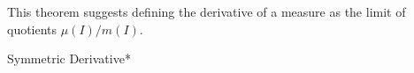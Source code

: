 This theorem suggests defining the derivative of a measure as the limit of quotients $\mu(I) / m(I)$. 

\begin{definition}{Symmetric Derivative}*
\end{definition}



